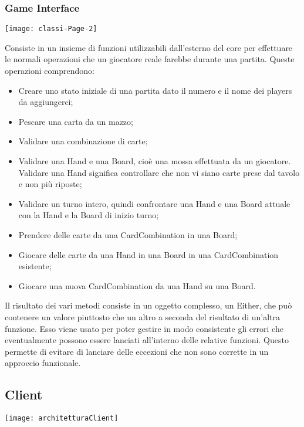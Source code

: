 \subsubsection{Game Interface}
\begin{center}
    \texttt{[image: classi-Page-2]}
\end{center}
Consiste in un insieme di funzioni utilizzabili dall’esterno del core per effettuare le normali operazioni che un giocatore reale farebbe durante una partita.
Queste operazioni comprendono:
\begin{itemize}
    \item Creare uno stato iniziale di una partita dato il numero e il nome dei players da aggiungerci;
    \item Pescare una carta da un mazzo;
    \item Validare una combinazione di carte;
    \item Validare una Hand e una Board, cioè una mossa effettuata da un giocatore. Validare una Hand significa controllare che non vi siano carte prese dal tavolo e non più riposte;
    \item Validare un turno intero, quindi confrontare una Hand e una Board attuale con la Hand e la Board di inizio turno;
    \item Prendere delle carte da una CardCombination in una Board;
    \item Giocare delle carte da una Hand in una Board in una CardCombination esistente;
    \item Giocare una nuova CardCombination da una Hand su una Board.
\end{itemize}
Il risultato dei vari metodi consiste in un oggetto complesso, un Either, che può contenere un valore piuttosto che un altro a seconda del risultato di un’altra funzione. Esso viene usato per poter gestire in modo consistente gli errori che eventualmente possono essere lanciati all’interno delle relative funzioni. Questo permette di evitare di lanciare delle eccezioni che non sono corrette in un approccio funzionale.

\subsection{Client}
\begin{center}
    \texttt{[image: architetturaClient]}
\end{center}

